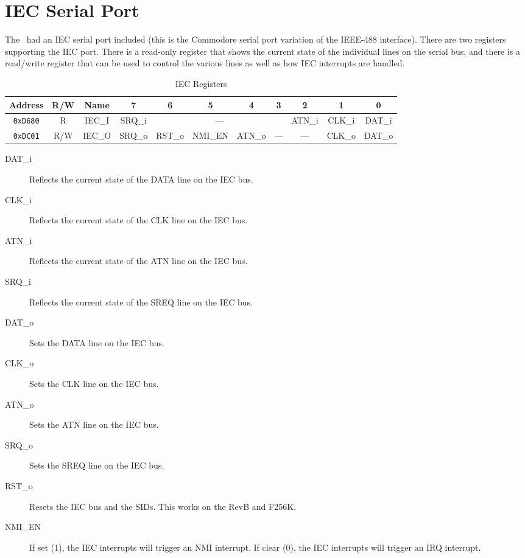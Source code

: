 \chapter{IEC Serial Port}

The \jr\ had an IEC serial port included (this is the Commodore serial port variation of the IEEE-488 interface). There are two registers supporting the IEC port. There is a read-only register that shows the current state of the individual lines on the serial bus, and there is a read/write register that can be used to control the various lines as well as how IEC interrupts are handled.

\begin{table}[h]
    \begin{center}
        \begin{tabular}{|c|c|c|c|c|c|c|c|c|c|c|} \hline
            Address & R/W & Name & 7 & 6 & 5 & 4 & 3 & 2 & 1 & 0 \\\hline\hline
            \verb+0xD680+ & R & IEC\_I & SRQ\_i & \multicolumn{4}{|c|}{---} & ATN\_i & CLK\_i & DAT\_i \\ \hline
            \verb+0xDC01+ & R/W & IEC\_O & SRQ\_o & RST\_o & NMI\_EN & ATN\_o & --- & --- & CLK\_o & DAT\_o \\ \hline
        \end{tabular}
    \end{center}
    \caption{IEC Registers}
    \label{tab:iec_reg}
\end{table}

\begin{description}
    \item[DAT\_i] Reflects the current state of the DATA line on the IEC bus. 
    \item[CLK\_i] Reflects the current state of the CLK line on the IEC bus.
    \item[ATN\_i] Reflects the current state of the ATN line on the IEC bus.
    \item[SRQ\_i] Reflects the current state of the SREQ line on the IEC bus.
    
    \item[DAT\_o] Sets the DATA line on the IEC bus. 
    \item[CLK\_o] Sets the CLK line on the IEC bus.
    \item[ATN\_o] Sets the ATN line on the IEC bus.
    \item[SRQ\_o] Sets the SREQ line on the IEC bus.
    \item[RST\_o] Resets the IEC bus and the SIDs. This works on the RevB and F256K. 
    \item[NMI\_EN] If set (1), the IEC interrupts will trigger an NMI interrupt. If clear (0), the IEC interrupts will trigger an IRQ interrupt.  
\end{description}
